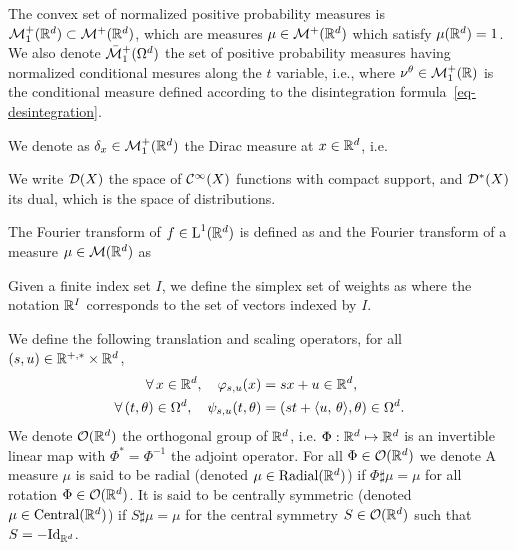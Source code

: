 The convex set of normalized positive probability measures is $\mathcal{M}_1^+(\mathbb{R}^d) \subset \mathcal{M}^+(\mathbb{R}^d)$, which are measures $\mu \in \mathcal{M}^+(\mathbb{R}^d)$ which satisfy $\mu(\mathbb{R}^d)=1$.
We also denote $\bar{\mathcal{M}}_1^+(\Omega^d)$ the set of positive probability measures having normalized conditional mesures along the $t$ variable, i.e.,
where $\nu^\theta \in \mathcal{M}_1^+( \mathbb{R} )$ is the conditional measure defined according to the disintegration formula~\eqref{eq-desintegration}. 

We denote as $\delta_x \in \mathcal{M}_1^+(\mathbb{R}^d)$ the Dirac measure at $x \in \mathbb{R}^d$, i.e. 

We write $\mathcal{D}(X)$ the space of $\mathcal{C}^\infty(X)$ functions with compact support, and $\mathcal{D}^*(X)$ its dual, which is the space of distributions.  



The Fourier transform of $f \in \text{\upshape L}^1(\mathbb{R}^d)$ is defined as
and the Fourier transform of a measure $\mu \in \mathcal{M}(\mathbb{R}^d)$ as

Given a finite index set $I$, we define the simplex set of weights as 
where the notation $\mathbb{R}^I$ corresponds to the set of vectors indexed by $I$. 

We define the following translation and scaling operators, for all $(s,u) \in \mathbb{R}^{+,*} \times \mathbb{R}^d$, 
\begin{align*}
		\forall \, x \in \mathbb{R}^d, \quad
			\varphi_{s,u}(x) &= s x + u \in \mathbb{R}^d, \\ 
		\forall \, (t,\theta) \in \Omega^d, \quad
			\psi_{s,u}(t, \theta) &= (st+\langle u,\,\theta\rangle, \theta) \in \Omega^d.
\end{align*}
We denote $\mathcal{O}(\mathbb{R}^d)$ the orthogonal group of $\mathbb{R}^d$, i.e. $\Phi : \mathbb{R}^d \mapsto \mathbb{R}^d$ is an invertible linear map with $\Phi^* = \Phi^{-1}$ the adjoint operator. For all $\Phi \in \mathcal{O}(\mathbb{R}^d)$ we denote  
A measure $\mu$ is said to be radial (denoted $\mu \in \text{\upshape Radial}(\mathbb{R}^d)$) if $\Phi \sharp \mu = \mu$ for all rotation $\Phi \in \mathcal{O}(\mathbb{R}^d)$. 
It is said to be centrally symmetric (denoted $\mu \in \text{\upshape Central}(\mathbb{R}^d)$) if $S \sharp \mu = \mu$ for the central symmetry $S \in \mathcal{O}(\mathbb{R}^d)$ such that $S = -\mathrm{Id}_{\mathbb{R}^d}$. 
